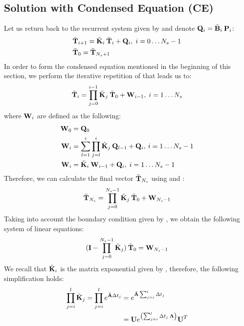 \subsection{Solution with Condensed Equation (CE)} \label{sec:ce-solution}
Let us return back to the recurrent system given by  and denote \mbox{$\mathbf{Q}_i = \tilde{\mathbf{B}}_i \: \mathbf{P}_i$}:
\begin{align}
  & \tilde{\mathbf{T}}_{i + 1} = \tilde{\mathbf{K}}_i \: \tilde{\mathbf{T}}_i + \mathbf{Q}_i, \; i = 0 \dots N_s - 1 \label{eq:ce-recurrent} \\
  & \tilde{\mathbf{T}}_0 = \tilde{\mathbf{T}}_{N_s + 1} \nonumber
\end{align}
In order to form the condensed equation mentioned in the beginning of this section, we perform the iterative repetition of  that leads us to:
\begin{equation} \label{eq:y-recurrent}
  \tilde{\mathbf{T}}_i = \prod_{j = 0}^{i - 1} \tilde{\mathbf{K}}_j \: \tilde{\mathbf{T}}_0 + \mathbf{W}_{i - 1}, \; i = 1 \dots N_s
\end{equation}
where $\mathbf{W}_i$ are defined as the following:
\begin{align}
  \mathbf{W}_0 & = \mathbf{Q}_0 \nonumber \\
  \mathbf{W}_i & = \sum_{l = 1}^i \prod_{j = l}^i \tilde{\mathbf{K}}_j \: \mathbf{Q}_{l - 1} + \mathbf{Q}_i, \: i = 1 \dots N_s - 1 \nonumber \\
  \mathbf{W}_i & = \tilde{\mathbf{K}}_i \: \mathbf{W}_{i - 1} + \mathbf{Q}_i, \; i = 1 \dots N_s - 1 \label{eq:p-recurrent}
\end{align}
Therefore, we can calculate the final vector $\tilde{\mathbf{T}}_{N_s}$ using  and :
\[
  \tilde{\mathbf{T}}_{N_s} = \prod_{j = 0}^{N_s - 1} \tilde{\mathbf{K}}_j \: \tilde{\mathbf{T}}_0 + \mathbf{W}_{N_s - 1}
\]
Taking into account the boundary condition given by , we obtain the following system of linear equations:
\begin{equation} \label{eq:core-system}
  (\mathbf{I} - \prod_{j = 0}^{N_s - 1} \tilde{\mathbf{K}}_j) \: \tilde{\mathbf{T}}_0 = \mathbf{W}_{N_s - 1}
\end{equation}
We recall that $\tilde{\mathbf{K}}_i$ is the matrix exponential given by , therefore, the following simplification holds:
\begin{align*}
  \prod_{j = i}^l \tilde{\mathbf{K}}_j = \prod_{j = i}^l e^{\tilde{\mathbf{A}} \Delta t_j} & = e^{\tilde{\mathbf{A}} \sum_{j = i}^l \Delta t_j} \\
  & = \mathbf{U} e^{\left( \sum_{j = i}^l \Delta t_j \: \mathbf{\Lambda} \right)} \mathbf{U}^T
\end{align*}
